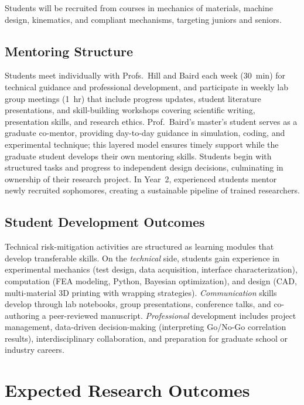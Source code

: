 \documentclass[11pt]{article}
\begin{document}
Students will be recruited from courses in mechanics of materials, machine
design, kinematics, and compliant mechanisms, targeting juniors and seniors.

\subsection*{Mentoring Structure}

Students meet individually with Profs.~Hill and Baird each week (30~min) for
technical guidance and professional development, and participate in weekly lab
group meetings (1~hr) that include progress updates, student literature
presentations, and skill-building workshops covering scientific writing,
presentation skills, and research ethics.  Prof.~Baird's master's student
serves as a graduate co-mentor, providing day-to-day guidance in simulation,
coding, and experimental technique; this layered model ensures timely support
while the graduate student develops their own mentoring skills.  Students begin
with structured tasks and progress to independent design decisions, culminating
in ownership of their research project.  In Year~2, experienced students mentor
newly recruited sophomores, creating a sustainable pipeline of trained
researchers.

\subsection*{Student Development Outcomes}

Technical risk-mitigation activities are structured as learning modules that
develop transferable skills.  On the \emph{technical} side, students gain
experience in experimental mechanics (test design, data acquisition, interface
characterization), computation (FEA modeling, Python, Bayesian optimization),
and design (CAD, multi-material 3D printing with wrapping strategies).
\emph{Communication} skills develop through lab notebooks, group presentations,
conference talks, and co-authoring a peer-reviewed manuscript.
\emph{Professional} development includes project management, data-driven
decision-making (interpreting Go/No-Go correlation results), interdisciplinary
collaboration, and preparation for graduate school or industry careers.

\section{Expected Research Outcomes}
\end{document}
